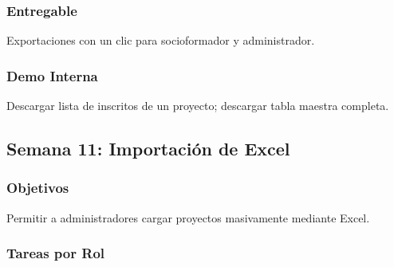 \documentclass[12pt,a4paper]{article}
\begin{document}
\subsubsection{Entregable}
Exportaciones con un clic para socioformador y administrador.

\subsubsection{Demo Interna}
Descargar lista de inscritos de un proyecto; descargar tabla maestra completa.

\subsection{Semana 11: Importación de Excel}

\subsubsection{Objetivos}
Permitir a administradores cargar proyectos masivamente mediante Excel.

\subsubsection{Tareas por Rol}
\end{document}
